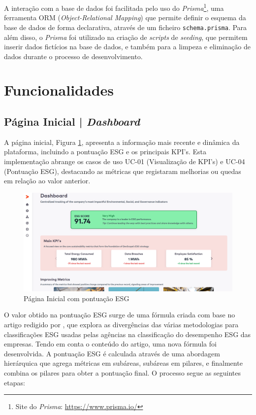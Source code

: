 A interação com a base de dados foi facilitada pelo uso do \textit{Prisma}\footnote{Site do \textit{Prisma}: \url{https://www.prisma.io/}}, uma ferramenta ORM (\textit{Object-Relational Mapping}) que permite definir o esquema da base de dados de forma declarativa, através de um ficheiro \texttt{schema.prisma}. Para além disso, o \textit{Prisma} foi utilizado na criação de \textit{scripts} de \textit{seeding}, que permitem inserir dados fictícios na base de dados, e também para a limpeza e eliminação de dados durante o processo de desenvolvimento.

\section{Funcionalidades}

\subsection{Página Inicial | \textit{Dashboard}}

A página inicial, Figura \ref{fig:homepage}, apresenta a informação mais recente e dinâmica da plataforma, incluindo a pontuação ESG e os principais KPI's. Esta implementação abrange os casos de uso UC-01 (Visualização de KPI's) e UC-04 (Pontuação ESG), destacando as métricas que registaram melhorias ou quedas em relação ao valor anterior.

\begin{figure}[H]
    \centering
    \includegraphics[width=\linewidth,keepaspectratio]{frontmatter/assets/platform_prints/dashboard/dashboard_done.png}
    \caption{Página Inicial com pontuação ESG}
    \label{fig:homepage}
\end{figure}

O valor obtido na pontuação ESG surge de uma fórmula criada com base no artigo redigido por \cite{Berg2022}, que explora as divergências das várias metodologias para classificações ESG usadas pelas agências na classificação do desempenho ESG das empresas. Tendo em conta o conteúdo do artigo, uma nova fórmula foi desenvolvida. A pontuação ESG é calculada através de uma abordagem hierárquica que agrega métricas em subáreas, subáreas em pilares, e finalmente combina os pilares para obter a pontuação final. O processo segue as seguintes etapas:

